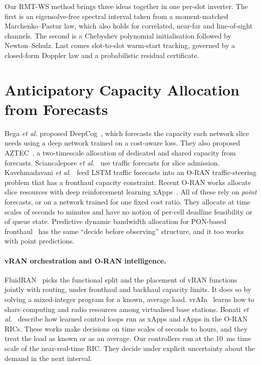 Our RMT-WS method brings three ideas together in one per-slot inverter. The first is an eigensolve-free spectral interval taken from a moment-matched Marchenko--Pastur law, which also holds for correlated, near-far and line-of-sight channels. The second is a Chebyshev polynomial initialisation followed by Newton--Schulz. Last comes slot-to-slot warm-start tracking, governed by a closed-form Doppler law and a probabilistic residual certificate.

\section{Anticipatory Capacity Allocation from Forecasts}
\label{sec:lit-alloc}

Bega \emph{et al.} proposed DeepCog~\cite{bega2019}, which forecasts the capacity each network slice needs using a deep network trained on a cost-aware loss. They also proposed AZTEC~\cite{bega2020}, a two-timescale allocation of dedicated and shared capacity from forecasts. Sciancalepore \emph{et al.}~\cite{sciancalepore2017} use traffic forecasts for slice admission. Kavehmadavani \emph{et al.}~\cite{kavehmadavani2023} feed LSTM traffic forecasts into an O-RAN traffic-steering problem that has a fronthaul capacity constraint. Recent O-RAN works allocate slice resources with deep reinforcement learning xApps~\cite{dai2025,sever2025,dora2025,cheng2023}. All of these rely on \emph{point} forecasts, or on a network trained for one fixed cost ratio. They allocate at time scales of seconds to minutes and have no notion of per-cell deadline feasibility or of queue state. Predictive dynamic bandwidth allocation for PON-based fronthaul~\cite{mikaeil2018} has the same ``decide before observing'' structure, and it too works with point predictions.

\paragraph{vRAN orchestration and O-RAN intelligence.} FluidRAN~\cite{garcia2018fluidran} picks the functional split and the placement of vRAN functions jointly with routing, under fronthaul and backhaul capacity limits. It does so by solving a mixed-integer program for a known, average load. vrAIn~\cite{ayala2019vrain} learns how to share computing and radio resources among virtualised base stations. Bonati \emph{et al.}~\cite{bonati2021} describe how learned control loops run as xApps and rApps in the O-RAN RICs. These works make decisions on time scales of seconds to hours, and they treat the load as known or as an average. Our controllers run at the 10~ms time scale of the near-real-time RIC. They decide under explicit uncertainty about the demand in the next interval.

